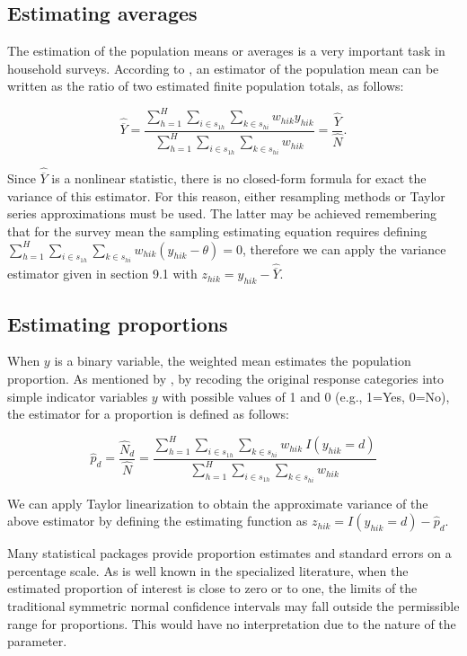 \documentclass[
  12pt,
]{book}
\begin{document}
\subsection{Estimating averages}\label{estimating-averages}

The estimation of the population means or averages is a very important task in household surveys. According to \citet{Gutierrez_2016}, an estimator of the population mean can be written as the ratio of two estimated finite population totals, as follows:

\[
\widehat{\overline{Y}} = \frac{\sum_{h=1}^{H}\sum_{i \in s_{1h}} \sum_{ k \in s_{hi}} w_{hik}y_{hik}} {\sum_{h=1}^{H}\sum_{i \in s_{1h}} \sum_{ k \in s_{hi}} w_{hik}} = \frac{\widehat{Y}}{\widehat{N}}.
\]

Since \(\widehat{\overline{Y}}\) is a nonlinear statistic, there is no closed-form formula for exact the variance of this estimator. For this reason, either resampling methods or Taylor series approximations must be used. The latter may be achieved remembering that for the survey mean the sampling estimating equation requires defining \(\sum_{h=1}^{H}\sum_{i \in s_{1h}} \sum_{ k \in s_{hi}} w_{hik} (y_{hik} - \theta) = 0\), therefore we can apply the variance estimator given in section 9.1 with \(z_{hik} = y_{hik} - \widehat{\overline{Y}}\).

\subsection{Estimating proportions}\label{estimating-proportions}

When \(y\) is a binary variable, the weighted mean estimates the population proportion. As mentioned by \citet{Heeringa2017}, by recoding the original response categories into simple indicator variables \(y\) with possible values of 1 and 0 (e.g., 1=Yes, 0=No), the estimator for a proportion is defined as follows:

\[
\widehat{p}_d = \frac{\widehat{N}_d}{\widehat{N}} = \frac{\sum_{h=1}^{H}\sum_{i \in s_{1h}} \sum_{ k \in s_{hi}} w_{hik}\ I(y_{hik} = d)} {\sum_{h=1}^{H}\sum_{i \in s_{1h}} \sum_{ k \in s_{hi}} w_{hik}}
\]

We can apply Taylor linearization to obtain the approximate variance of the above estimator by defining the estimating function as \(z_{hik} = I(y_{hik} = d) - \widehat{p}_d\).

Many statistical packages provide proportion estimates and standard errors on a percentage scale. As is well known in the specialized literature, when the estimated proportion of interest is close to zero or to one, the limits of the traditional symmetric normal confidence intervals may fall outside the permissible range for proportions. This would have no interpretation due to the nature of the parameter.
\end{document}
